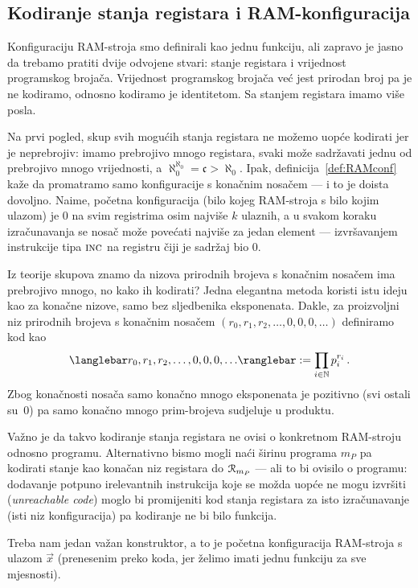 \subsection{Kodiranje stanja registara i RAM-konfiguracija}

Konfiguraciju RAM-stroja smo definirali kao jednu funkciju, ali zapravo je jasno da trebamo pratiti dvije odvojene stvari: stanje registara i vrijednost programskog brojača. Vrijednost programskog brojača već jest prirodan broj pa je ne kodiramo, odnosno kodiramo je identitetom. Sa stanjem registara imamo više posla.

Na prvi pogled, skup svih mogućih stanja registara ne možemo uopće kodirati jer je neprebrojiv: imamo prebrojivo mnogo registara, svaki može sadržavati jednu od prebrojivo mnogo vrijednosti, a $\aleph_0^{\aleph_0}\!=\mathfrak c>\aleph_0$. Ipak, definicija~\ref{def:RAMconf} kaže da promatramo samo konfiguracije s konačnim nosačem --- i to je doista dovoljno. Naime, početna konfiguracija (bilo kojeg RAM-stroja s bilo kojim ulazom) je $0$ na svim registrima osim najviše $k$ ulaznih, a u svakom koraku izračunavanja se nosač može povećati najviše za jedan element --- izvršavanjem instrukcije tipa $\textsc{inc}$ na registru čiji je sadržaj bio $0$.

Iz teorije skupova znamo da nizova prirodnih brojeva s konačnim nosačem ima prebrojivo mnogo, no kako ih kodirati? Jedna elegantna metoda koristi istu ideju kao za konačne nizove, samo bez sljedbenika eksponenata. Dakle, za proizvoljni niz prirodnih brojeva s konačnim nosačem $(r_0,r_1,r_2,\dotsc,0,0,0,\dotsc)$ definiramo kod kao
\begin{equation}\label{eq:defkreg}
    \knk{r_0,r_1,r_2,\dotsc,0,0,0,\dotsc}:=\prod_{i\in\N}p_i^{r_i}\,\text.
\end{equation}
Zbog konačnosti nosača samo konačno mnogo eksponenata je pozitivno (svi ostali su~$0$) pa samo konačno mnogo prim-brojeva sudjeluje u produktu.

Važno je da takvo kodiranje stanja registara ne ovisi o konkretnom RAM-stroju odnosno programu. Alternativno bismo mogli naći širinu programa $m_P$ pa kodirati stanje kao konačan niz registara do $\mathcal R_{m_P}$\! --- ali to bi ovisilo o programu: dodavanje potpuno irelevantnih instrukcija koje se možda uopće ne mogu izvršiti (\emph{unreachable code}\/) moglo bi promijeniti kod stanja registara za isto izračunavanje (isti niz konfiguracija) pa kodiranje ne bi bilo funkcija.

Treba nam jedan važan konstruktor, a to je %
početna konfiguracija RAM-stroja s ulazom $\vec x$ (prenesenim preko koda, jer želimo imati jednu funkciju za sve mjesnosti).

